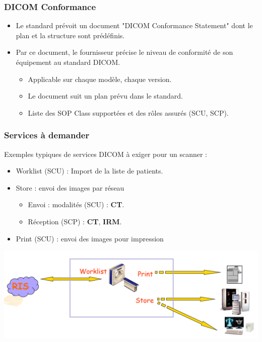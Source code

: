 \frame
{
	\frametitle{DICOM Conformance}
	\begin{itemize}
		\item Le standard pr\'evoit un document "DICOM Conformance Statement" dont le plan et la structure sont pr\'ed\'efinis.
		\item Par ce document, le fournisseur pr\'ecise le niveau de conformit\'e de son \'equipement au standard DICOM.
		\begin{itemize}
			\item Applicable sur chaque mod\`ele, chaque version.
			\item Le document suit un plan pr\'evu dans le standard.
			\item Liste des SOP Class support\'ees et des r\^oles assur\'es (SCU, SCP).
		\end{itemize}
	\end{itemize}
}


\frame
{
	\frametitle{Services \`a demander}
	Exemples typiques de services DICOM \`a exiger pour un scanner :
	\begin{itemize}
		\item Worklist (SCU) : Import de la liste de patients.
		\item Store : envoi des images par r\'eseau
		\begin{itemize}
			\item Envoi : modalit\'es (SCU) : \textbf{CT}.
			\item R\'eception (SCP) : \textbf{CT}, \textbf{IRM}.
		\end{itemize}
		\item Print (SCU) : envoi des images pour impression
	\end{itemize}
	
	\begin{center}
		\includegraphics[width=\linewidth]{./figures/services-ct.png}
	\end{center}

}

